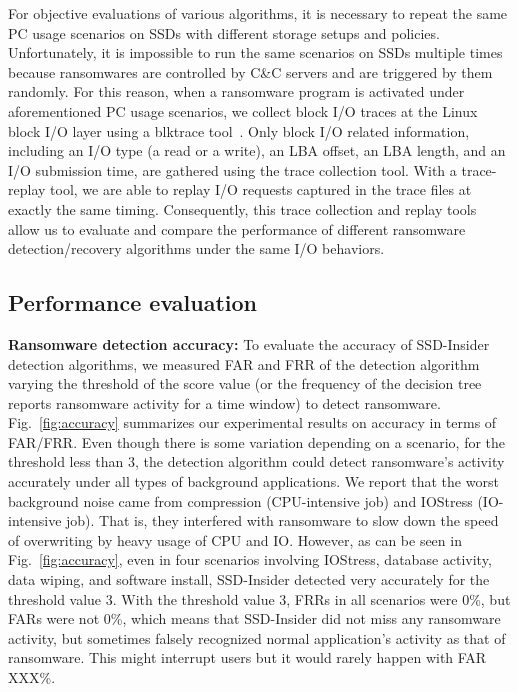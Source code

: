 \documentclass[conference]{IEEEtran}
\newcommand{\ours}{SSD-Insider}
\begin{document}
For objective evaluations of various algorithms, it is necessary to
repeat the same PC usage scenarios on SSDs with different storage
setups and policies.  Unfortunately, it is impossible to run the
same scenarios on SSDs multiple times because ransomwares are
controlled by C\&C servers and are triggered by them randomly. For
this reason, when a ransomware program is activated under
aforementioned PC usage scenarios, we collect block I/O traces at
the Linux block I/O layer using a blktrace tool~\cite{blktrace}.  Only
block I/O related information, including an I/O type (a read or a
write), an LBA offset, an LBA length, and an I/O submission time,
are gathered using the trace collection tool.  With a trace-replay
tool, we are able to replay I/O requests captured in the trace
files at exactly the same timing.  Consequently, this trace
collection and replay tools allow us to evaluate and compare the
performance of different ransomware detection/recovery algorithms
under the same I/O behaviors. 


\subsection{Performance evaluation}\label{sec:peval}
{\noindent\bf Ransomware detection accuracy:}
To evaluate the accuracy of SSD-Insider detection algorithms,
we measured FAR and FRR of the detection algorithm varying the threshold of the score value (or the frequency of the
decision tree reports ransomware activity for a time window) to detect ransomware. 
Fig.~\ref{fig:accuracy} summarizes our experimental results on accuracy in terms of FAR/FRR. 
Even though there is some variation depending on a scenario, for the threshold less than 3, 
the detection algorithm could detect ransomware's activity accurately under all types of background applications. 
We report that the worst background noise came from compression (CPU-intensive job) and IOStress (IO-intensive job).
That is, they interfered with ransomware to slow down the speed of overwriting by heavy usage of CPU and IO.
However, as can be seen in Fig.~\ref{fig:accuracy}, even in four scenarios involving IOStress, database activity, 
data wiping, and software install, \ours{} detected very accurately for the threshold value 3.
With the threshold value 3, FRRs in all scenarios were 0\%, but FARs were not 0\%, which means that
\ours{} did not miss any ransomware activity, but sometimes falsely recognized normal application's activity as 
that of ransomware. This might interrupt users but it would rarely happen with FAR XXX\%.
\end{document}

